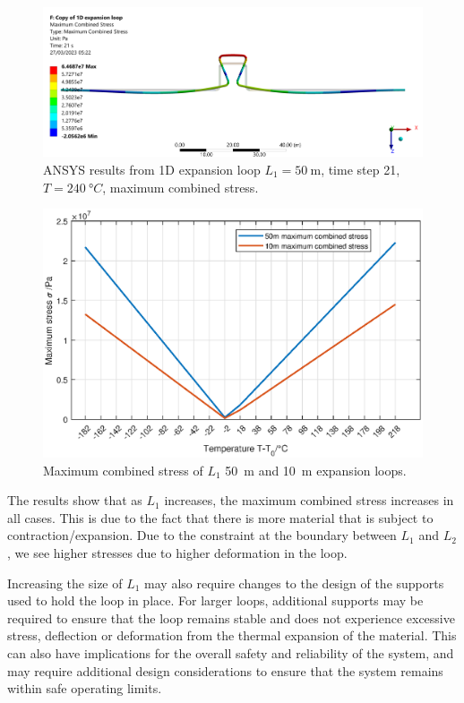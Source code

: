 \begin{figure}[H]
    \centering
    \includegraphics[width = \textwidth]{img/part2e-4.png}
    \caption{ANSYS results from 1D expansion loop $L_1 = \SI{50}{\meter}$, time step 21, $T = \SI{240}{\degree C}$, maximum combined stress.}
\end{figure}
\begin{figure}[H]
    \centering
    \includegraphics[width = \textwidth]{img/part2ei.eps}
    \caption{Maximum combined stress of $L_1$ \SI{50}{\meter} and \SI{10}{\meter} expansion loops.}
\end{figure}
The results show that as $L_1$ increases, the maximum combined stress increases in all cases. This is due to the fact that there is more material that is subject to contraction/expansion. Due to the constraint at the boundary between $L_1$ and $L_2$, we see higher stresses due to higher deformation in the loop.

Increasing the size of $L_1$ may also require changes to the design of the supports used to hold the loop in place. For larger loops, additional supports may be required to ensure that the loop remains stable and does not experience excessive stress, deflection or deformation from the thermal expansion of the material. This can also have implications for the overall safety and reliability of the system, and may require additional design considerations to ensure that the system remains within safe operating limits.